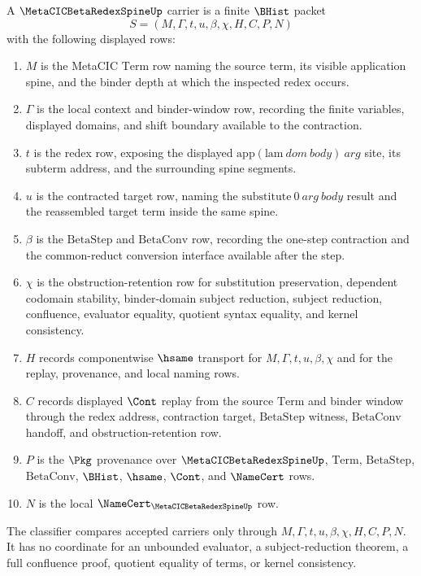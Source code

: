 \begin{definition}
\label{def:metacic-beta-redex-spine-carrier}
A $\MetaCICBetaRedexSpineUp$ carrier is a finite $\BHist$ packet
$$
S=(M,\Gamma,t,u,\beta,\chi,H,C,P,N)
$$
with the following displayed rows:
\begin{enumerate}
\item $M$ is the MetaCIC $\mathrm{Term}$ row naming the source term, its visible application spine, and the binder depth at which the inspected redex occurs.
\item $\Gamma$ is the local context and binder-window row, recording the finite variables, displayed domains, and shift boundary available to the contraction.
\item $t$ is the redex row, exposing the displayed $\mathrm{app}(\mathrm{lam}\ dom\ body)\ arg$ site, its subterm address, and the surrounding spine segments.
\item $u$ is the contracted target row, naming the $\mathrm{substitute}\ 0\ arg\ body$ result and the reassembled target term inside the same spine.
\item $\beta$ is the $\mathrm{BetaStep}$ and $\mathrm{BetaConv}$ row, recording the one-step contraction and the common-reduct conversion interface available after the step.
\item $\chi$ is the obstruction-retention row for substitution preservation, dependent codomain stability, binder-domain subject reduction, subject reduction, confluence, evaluator equality, quotient syntax equality, and kernel consistency.
\item $H$ records componentwise $\hsame$ transport for $M,\Gamma,t,u,\beta,\chi$ and for the replay, provenance, and local naming rows.
\item $C$ records displayed $\Cont$ replay from the source $\mathrm{Term}$ and binder window through the redex address, contraction target, $\mathrm{BetaStep}$ witness, $\mathrm{BetaConv}$ handoff, and obstruction-retention row.
\item $P$ is the $\Pkg$ provenance over $\MetaCICBetaRedexSpineUp$, $\mathrm{Term}$, $\mathrm{BetaStep}$, $\mathrm{BetaConv}$, $\BHist$, $\hsame$, $\Cont$, and $\NameCert$ rows.
\item $N$ is the local $\NameCert_{\MetaCICBetaRedexSpineUp}$ row.
\end{enumerate}
The classifier compares accepted carriers only through $M,\Gamma,t,u,\beta,\chi,H,C,P,N$. It has no coordinate for an unbounded evaluator, a subject-reduction theorem, a full confluence proof, quotient equality of terms, or kernel consistency.
\end{definition}

